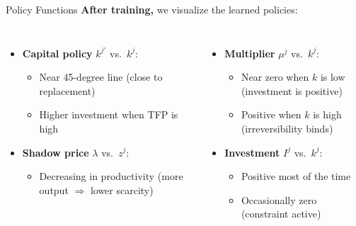 \documentclass[aspectratio=169,11pt]{beamer}
\begin{document}
\begin{frame}{Policy Functions}
\textbf{After training,} we visualize the learned policies:

\vspace{0.3em}
\begin{columns}[T]
\begin{itemize}
    \item \textbf{Capital policy} $k^{j\prime}$ vs.\ $k^j$:
    \begin{itemize}
        \item Near 45-degree line (close to replacement)
        \item Higher investment when TFP is high
    \end{itemize}
    \vspace{0.3em}
    \item \textbf{Shadow price} $\lambda$ vs.\ $z^j$:
    \begin{itemize}
        \item Decreasing in productivity (more output $\Rightarrow$ lower scarcity)
    \end{itemize}
\end{itemize}

\begin{itemize}
    \item \textbf{Multiplier} $\mu^j$ vs.\ $k^j$:
    \begin{itemize}
        \item Near zero when $k$ is low (investment is positive)
        \item Positive when $k$ is high (irreversibility binds)
    \end{itemize}
    \vspace{0.3em}
    \item \textbf{Investment} $I^j$ vs.\ $k^j$:
    \begin{itemize}
        \item Positive most of the time
        \item Occasionally zero (constraint active)
    \end{itemize}
\end{itemize}
\end{columns}
\end{frame}
\end{document}

